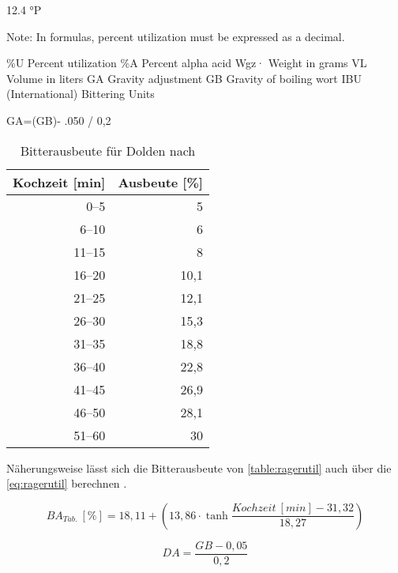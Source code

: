 \documentclass[a4paper,parskip=half]{scrartcl}
\begin{document}
12.4 °P

Note: In formulas, percent utilization
must be expressed as a decimal.

\%U Percent utilization
\%A Percent alpha acid
Wgz· Weight in grams
VL Volume in liters
GA Gravity adjustment
GB Gravity of boiling wort
IBU (International) Bittering Units

GA=(GB)- .050 / 0,2

\parencite[54]{Rager1990}

\begin{table}[H]
\centering
\begin{tabular}{rr}
\toprule
\multicolumn{1}{c}{\textbf{Kochzeit [min]}} & \multicolumn{1}{c}{\textbf{Ausbeute [\%]}} \\
\midrule
0–5             & 5 \\
6–10            & 6 \\
11–15           & 8 \\
16–20           & 10,1 \\
21–25           & 12,1 \\
26–30           & 15,3 \\
31–35           & 18,8 \\
36–40           & 22,8 \\
41–45           & 26,9 \\
46–50           & 28,1 \\
51–60           & 30 \\
\bottomrule
\end{tabular}
\caption{Bitterausbeute für Dolden nach \citeauthor{Rager1990} \parencite[54]{Rager1990}}
\label{table:ragerutil}
\end{table}




Näherungsweise lässt sich die Bitterausbeute von \autoref{table:ragerutil}
auch über die \autoref{eq:ragerutil} berechnen \parencite{Steinmeyer2021}. 

\begin{equation}
\mathit{BA}_{\mathit{Tab.}}\:[\%] = 18,11 + \left(13,86 \cdot \tanh{\frac{\mathit{Kochzeit}\:[min] - 31,32}{18,27}}\right)
\label{eq:ragerutil}
\end{equation}

\begin{equation}
\mathit{DA} = \frac{\mathit{GB} - 0,05}{0,2}
\label{eq:ragerga}
\end{equation}
\end{document}
